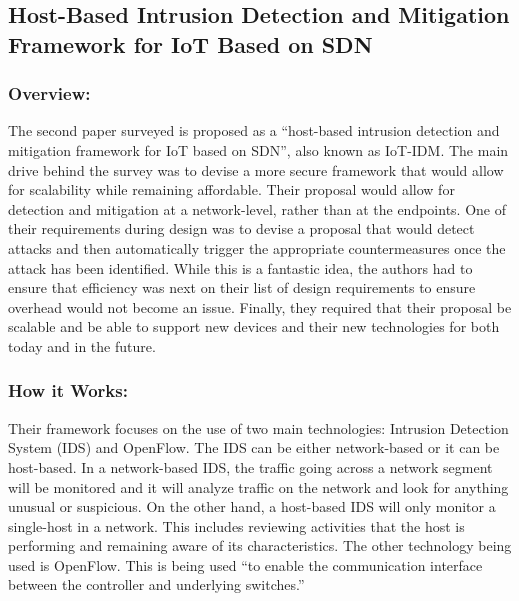 \subsection {Host-Based Intrusion Detection and Mitigation Framework for IoT Based on SDN}
\subsubsection {Overview:}
\smallskip

The second paper surveyed is proposed as a “host-based intrusion detection and mitigation framework for IoT based on SDN”, also known as IoT-IDM. \cite {kalkan2017securing} The main drive behind the survey was to devise a more secure framework that would allow for scalability while remaining affordable. Their proposal would allow for detection and mitigation at a network-level, rather than at the endpoints. One of their requirements during design was to devise a proposal that would detect attacks and then automatically trigger the appropriate countermeasures once the attack has been identified. While this is a fantastic idea, the authors had to ensure that efficiency was next on their list of design requirements to ensure overhead would not become an issue. Finally, they required that their proposal be scalable and be able to support new devices and their new technologies for both today and in the future.

\subsubsection {How it Works:}
\smallskip

Their framework focuses on the use of two main technologies: Intrusion Detection System (IDS) and OpenFlow. The IDS can be either network-based or it can be host-based. In a network-based IDS, the traffic going across a network segment will be monitored and it will analyze traffic on the network and look for anything unusual or suspicious. On the other hand, a host-based IDS will only monitor a single-host in a network. This includes reviewing activities that the host is performing and remaining aware of its characteristics. The other technology being used is OpenFlow. This is being used “to enable the communication interface between the controller and underlying switches.” \cite {nobakht2016host}

\smallskip

